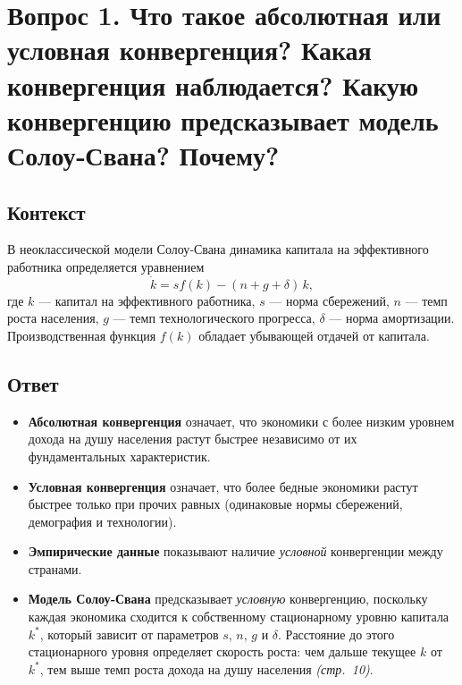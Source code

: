 \section{Вопрос 1. Что такое абсолютная или условная конвергенция? Какая конвергенция наблюдается? Какую конвергенцию предсказывает модель Солоу‑Свана? Почему?}

\subsection*{Контекст}
В неоклассической модели Солоу‑Свана динамика капитала на эффективного работника определяется уравнением
\[
\dot k = s f(k) - (n + g + \delta)\,k,
\]
где \(k\) — капитал на эффективного работника, \(s\) — норма сбережений, \(n\) — темп роста населения, \(g\) — темп
 технологического прогресса, \(\delta\) — норма амортизации. 
 Производственная функция \(f(k)\) обладает убывающей отдачей от капитала.

\subsection*{Ответ}
\begin{itemize}
  \item \textbf{Абсолютная конвергенция} означает, что экономики с более низким уровнем дохода на душу населения растут быстрее независимо от их фундаментальных характеристик.
  \item \textbf{Условная конвергенция} означает, что более бедные экономики растут быстрее только при прочих равных (одинаковые нормы сбережений, демография и технологии).
  \item \textbf{Эмпирические данные} показывают наличие \emph{условной} конвергенции между странами.
  \item \textbf{Модель Солоу‑Свана} предсказывает \emph{условную} конвергенцию, поскольку каждая экономика сходится к 
  собственному стационарному уровню капитала \(k^*\), который зависит от параметров \(s\), \(n\), \(g\) и \(\delta\). 
  Расстояние до этого стационарного уровня определяет скорость роста: чем дальше текущее \(k\) от \(k^*\), тем выше темп 
  роста дохода на душу населения {\it (стр.~10)}.
\end{itemize}
